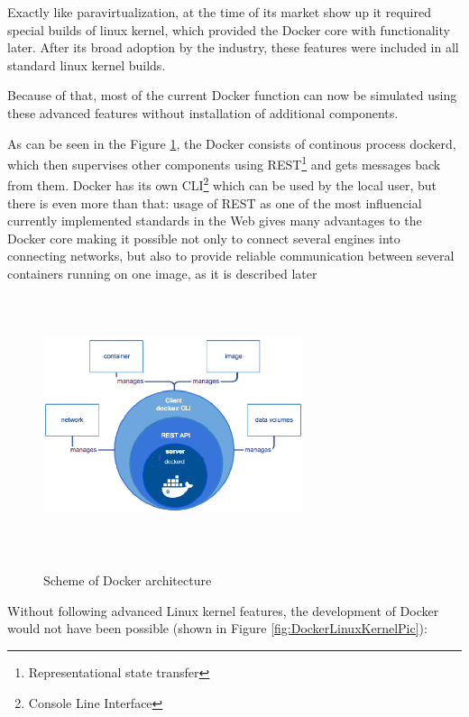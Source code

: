 Exactly like paravirtualization, at the time of its market show up
it required special builds of linux kernel, which provided the Docker core with
functionality later. After its broad adoption by the industry, these features
were included in all standard linux kernel builds.

Because of that, most of the current Docker function can now be simulated
using these advanced features without installation of additional components.

As can be seen in the Figure \ref{fig:DockerArch}, the Docker consists
of continous process dockerd, which then supervises other
components using REST\footnote{Representational state transfer}
and gets messages back from them. Docker has its
own CLI\footnote{Console Line Interface} which can be used by the local
user, but there is even more than that:
usage of REST as one of the most influencial currently implemented
standards in the Web gives many advantages to the Docker core making it possible
not only to connect several engines into connecting networks,
but also to provide reliable communication between several containers running on
one image, as it is described later \cite{DockerArch}

\begin{figure}
\includegraphics[height=3in, width=3in]{dockerarch}
\caption{Scheme of Docker architecture}
\cite{DockerArch}
\label{fig:DockerArch}
\end{figure}

Without following advanced Linux kernel features,
the development of Docker would not have been possible
(shown in Figure \ref{fig:DockerLinuxKernelPic}):

